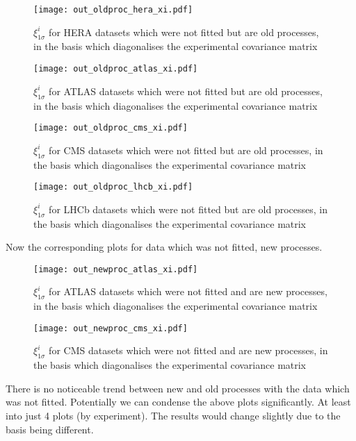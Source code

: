 \begin{figure}[!b]
    \centering
    \texttt{[image: out\_oldproc\_hera\_xi.pdf]}
    \caption{$\xi_{1\sigma}^{i}$ for HERA datasets which were not fitted
    but are old processes, in the basis which diagonalises the experimental
    covariance matrix}
    \label{fig:outoldheraxi}
\end{figure}

\begin{figure}[ht]
    \centering
    \texttt{[image: out\_oldproc\_atlas\_xi.pdf]}
    \caption{$\xi_{1\sigma}^{i}$ for ATLAS datasets which were not fitted
    but are old processes, in the basis which diagonalises the experimental
    covariance matrix}
    \label{fig:outoldatlasxi}
\end{figure}

\begin{figure}[ht]
    \centering
    \texttt{[image: out\_oldproc\_cms\_xi.pdf]}
    \caption{$\xi_{1\sigma}^{i}$ for CMS datasets which were not fitted
    but are old processes, in the basis which diagonalises the experimental
    covariance matrix}
    \label{fig:outoldcmsxi}
\end{figure}

\begin{figure}[ht]
    \centering
    \texttt{[image: out\_oldproc\_lhcb\_xi.pdf]}
    \caption{$\xi_{1\sigma}^{i}$ for LHCb datasets which were not fitted
    but are old processes, in the basis which diagonalises the experimental
    covariance matrix}
    \label{fig:outoldlhcbxi}
\end{figure}

Now the corresponding plots for data which was not fitted, new processes.

\begin{figure}[ht]
    \centering
    \texttt{[image: out\_newproc\_atlas\_xi.pdf]}
    \caption{$\xi_{1\sigma}^{i}$ for ATLAS datasets which were not fitted
    and are new processes, in the basis which diagonalises the experimental
    covariance matrix}
    \label{fig:outnewatlasxi}
\end{figure}

\begin{figure}[ht]
    \centering
    \texttt{[image: out\_newproc\_cms\_xi.pdf]}
    \caption{$\xi_{1\sigma}^{i}$ for CMS datasets which were not fitted
    and are new processes, in the basis which diagonalises the experimental
    covariance matrix}
    \label{fig:outnewcmsxi}
\end{figure}

There is no noticeable trend between new and old processes with the data which
was not fitted. Potentially we can condense the above plots significantly. At
least into just 4 plots (by experiment). The results would change slightly
due to the basis being different.
